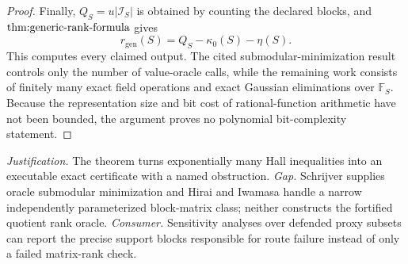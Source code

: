 \documentclass{article}
\begin{document}
\begin{proof}
Finally, \(Q_S=u|\mathcal I_S|\) is obtained by counting the declared blocks, and \(\textnormal{thm:generic-rank-formula}\) gives
\[
 r_{\mathrm{gen}}(S)=Q_S-\kappa_0(S)-\eta(S).
\]
This computes every claimed output.  The cited submodular-minimization result controls only the number of value-oracle calls, while the remaining work consists of finitely many exact field operations and exact Gaussian eliminations over \(\mathbb F_S\).  Because the representation size and bit cost of rational-function arithmetic have not been bounded, the argument proves no polynomial bit-complexity statement.
\end{proof}
\par\smallskip\noindent \textit{Justification.} The theorem turns exponentially many Hall inequalities into an executable exact certificate with a named obstruction. \textit{Gap.} Schrijver supplies oracle submodular minimization and Hirai and Iwamasa handle a narrow independently parameterized block-matrix class; neither constructs the fortified quotient rank oracle. \textit{Consumer.} Sensitivity analyses over defended proxy subsets can report the precise support blocks responsible for route failure instead of only a failed matrix-rank check.
\end{document}
